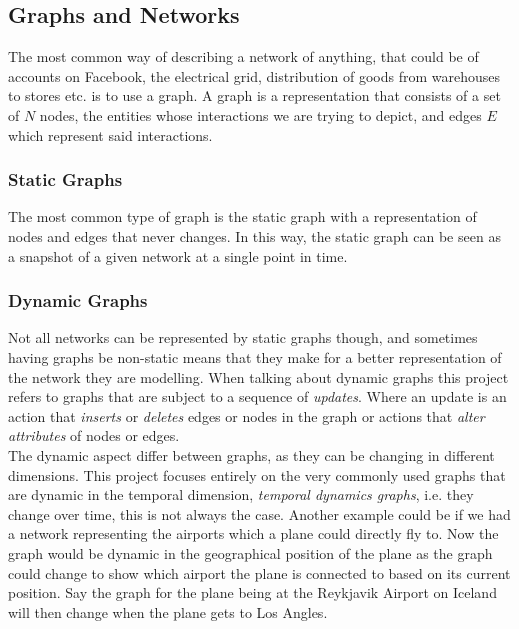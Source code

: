 \subsection{Graphs and Networks}
\label{sec:Method:Graphs}
The most common way of describing a network of anything, that could be of accounts on Facebook, the electrical grid, distribution of goods from warehouses to stores etc. is to use a graph.
A graph is a representation that consists of a set of $N$ nodes, the entities whose interactions we are trying to depict, and edges $E$ which represent said interactions.

\subsubsection{Static Graphs}
\label{sec:Method:Graphs:StaticGraphs}
The most common type of graph is the static graph with a representation of nodes and edges that never changes. In this way, the static graph can be seen as a snapshot of a given network at a single point in time.


\subsubsection{Dynamic Graphs}
\label{sec:Method:Graphs:DynamicGraphs}
Not all networks can be represented by static graphs though, and sometimes having graphs be non-static means that they make for a better representation of the network they are modelling. When talking about dynamic graphs this project refers to graphs that are subject to a sequence of \textit{updates}. Where an update is an action that \textit{inserts} or \textit{deletes} edges or nodes in the graph or actions that \textit{alter attributes} of nodes or edges.
\\
The dynamic aspect differ between graphs, as they can be changing in different dimensions. This project focuses entirely on the very commonly used graphs that are dynamic in the temporal dimension, \textit{temporal dynamics graphs}, i.e. they change over time, this is not always the case. Another example could be if we had a network representing the airports which a plane could directly fly to. Now the graph would be dynamic in the geographical position of the plane as the graph could change to show which airport the plane is connected to based on its current position. Say the graph for the plane being at the Reykjavik Airport on Iceland will then change when the plane gets to Los Angles.











